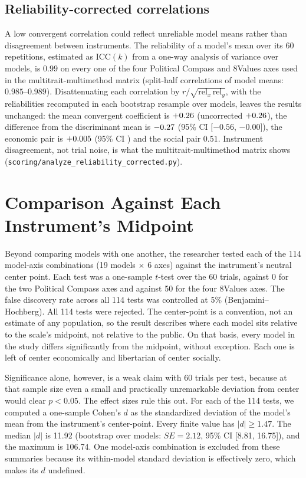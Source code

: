 \documentclass[12pt]{article}
\begin{document}
\subsection{Reliability-corrected correlations}
\label{si:reliability}
A low convergent correlation could reflect unreliable model means rather than disagreement between instruments. The reliability of a
model's mean over its 60 repetitions, estimated as $\mathrm{ICC}(k)$ from a one-way analysis of variance over models, is
$0.99$ on every one of the four Political Compass and 8Values axes used in the multitrait-multimethod matrix (split-half correlations
of model means: $0.985$--$0.989$). Disattenuating each correlation by $r/\sqrt{\mathrm{rel}_x\,\mathrm{rel}_y}$, with the
reliabilities recomputed in each bootstrap resample over models, leaves the results unchanged: the mean convergent coefficient is
$+0.26$ (uncorrected $+0.26$), the difference from the discriminant mean is $-0.27$ (95\% CI $[-0.56$, $-0.00]$), the economic pair
is $+0.005$ (95\% CI \EconCorrCI) and the social pair $0.51$. Instrument disagreement, not trial noise, is what the multitrait-multimethod
matrix shows (\texttt{scoring/analyze\_reliability\_corrected.py}).

\section{Comparison Against Each Instrument's Midpoint}
\label{si:human-baseline}

Beyond comparing models with one another, the researcher tested each of the 114 model-axis
combinations (19 models $\times$ 6 axes) against the instrument's neutral center point. Each test was a
one-sample $t$-test over the 60 trials, against 0 for the two Political Compass axes and against 50 for the
four 8Values axes. The false discovery rate across all 114 tests was controlled at 5\%
(Benjamini--Hochberg). All 114 tests were rejected. The center-point is a convention, not an estimate of
any population, so the result describes where each model sits relative to the scale's midpoint, not
relative to the public. On that basis, every model in the study differs significantly from the midpoint,
without exception. Each one is left of center economically and libertarian of center socially.

Significance alone, however, is a weak claim with 60 trials per test, because at that sample size even a
small and practically unremarkable deviation from center would clear $p<0.05$. The effect sizes rule this
out. For each of the 114 tests, we computed a one-sample Cohen's $d$ as the standardized deviation of
the model's mean from the instrument's center-point. Every finite value has $|d|\geq 1.47$. The median $|d|$
is 11.92 (bootstrap over models: $SE=2.12$, 95\% CI [8.81, 16.75]), and the maximum is 106.74. One
model-axis combination is excluded from these summaries because its within-model standard deviation
is effectively zero, which makes its $d$ undefined.
\end{document}
